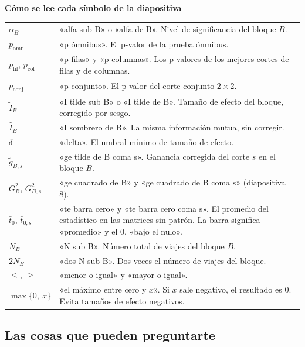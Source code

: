 \documentclass[11pt,a4paper]{article}
\newcommand{\cajainicio}[3]{\par\medskip\noindent
  \begin{lrbox}{\cajabox}\begin{minipage}{\dimexpr\linewidth-2\fboxsep-2\fboxrule\relax}%
  \textbf{\color{#1}#3}\par\smallskip}
\newcommand{\cajafin}[2]{\end{minipage}\end{lrbox}\fcolorbox{#1}{#2}{\usebox{\cajabox}}\par\medskip}
\newenvironment{nota}[1]{\cajainicio{acc}{acc!7}{#1}}{\cajafin{acc}{acc!7}}
\begin{document}
\begin{nota}{Cómo se lee cada símbolo de la diapositiva}
\begin{tabular}{@{}p{3.6cm}p{11.2cm}@{}}
$\alpha_B$ & «alfa sub B» o «alfa de B». Nivel de significancia del bloque $B$.\\
$p_{\mathrm{omn}}$ & «p ómnibus». El p-valor de la prueba ómnibus.\\
$p_{\mathrm{fil}}$, $p_{\mathrm{col}}$ & «p filas» y «p columnas». Los p-valores de los mejores cortes de filas y de columnas.\\
$p_{\mathrm{conj}}$ & «p conjunto». El p-valor del corte conjunto $2\times2$.\\
$\tilde I_B$ & «I tilde sub B» o «I tilde de B». Tamaño de efecto del bloque, corregido por sesgo.\\
$\hat I_B$ & «I sombrero de B». La misma información mutua, sin corregir.\\
$\delta$ & «delta». El umbral mínimo de tamaño de efecto.\\
$\tilde g_{B,s}$ & «ge tilde de B coma s». Ganancia corregida del corte $s$ en el bloque $B$.\\
$G^2_B$, $G^2_{B,s}$ & «ge cuadrado de B» y «ge cuadrado de B coma s» (diapositiva 8).\\
$\bar t_0$, $\bar t_{0,s}$ & «te barra cero» y «te barra cero coma s». El promedio del estadístico en las matrices sin patrón. La barra significa «promedio» y el 0, «bajo el nulo».\\
$N_B$ & «N sub B». Número total de viajes del bloque $B$.\\
$2N_B$ & «dos N sub B». Dos veces el número de viajes del bloque.\\
$\le$, $\ge$ & «menor o igual» y «mayor o igual».\\
$\max\{0,\ x\}$ & «el máximo entre cero y $x$». Si $x$ sale negativo, el resultado es 0. Evita tamaños de efecto negativos.\\
\end{tabular}
\end{nota}

\subsection*{Las cosas que pueden preguntarte}
\end{document}
